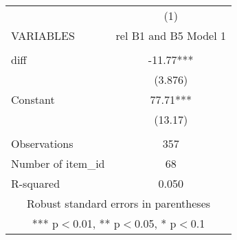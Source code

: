 \documentclass[]{article}
\begin{document}
\begin{tabular}{lc} \hline
 & (1) \\
VARIABLES & rel B1 and B5 Model 1 \\ \hline
 &  \\
diff & -11.77*** \\
 & (3.876) \\
Constant & 77.71*** \\
 & (13.17) \\
 &  \\
Observations & 357 \\
Number of item\_id & 68 \\
 R-squared & 0.050 \\ \hline
\multicolumn{2}{c}{ Robust standard errors in parentheses} \\
\multicolumn{2}{c}{ *** p$<$0.01, ** p$<$0.05, * p$<$0.1} \\
\end{tabular}
\end{document}
